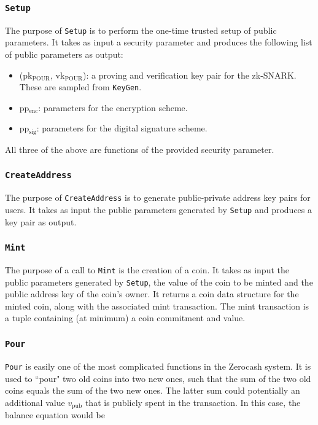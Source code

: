 \documentclass{article}
\begin{document}
\subsubsection{\texttt{Setup}}
The purpose of \texttt{Setup} is to perform the one-time trusted setup of public parameters. It takes as input a security parameter and produces the following list of public parameters as output:
\begin{itemize}
\item (pk$_{\text{POUR}}$, vk$_{\text{POUR}}$): a proving and verification key pair for the zk-SNARK. These are sampled from \texttt{KeyGen}.
\item pp$_{\text{enc}}$: parameters for the encryption scheme.
\item pp$_{\text{sig}}$: parameters for the digital signature scheme.
\end{itemize}
All three of the above are functions of the provided security parameter.

\subsubsection{\texttt{CreateAddress}}
The purpose of \texttt{CreateAddress} is to generate public-private address key pairs for users. It takes as input the public parameters generated by \texttt{Setup} and produces a key pair as output.

\subsubsection{\texttt{Mint}}
The purpose of a call to \texttt{Mint} is the creation of a coin. It takes as input the public parameters generated by \texttt{Setup}, the value of the coin to be minted and the public address key of the coin's owner. It returns a coin data structure for the minted coin, along with the associated mint transaction. The mint transaction is a tuple containing (at minimum) a coin commitment and value.

\subsubsection{\texttt{Pour}}
\texttt{Pour} is easily one of the most complicated functions in the Zerocash system. It is used to ``pour" two old coins into two new ones, such that the sum of the two old coins equals the sum of the two new ones. The latter sum could potentially an additional value $v_{\text{pub}}$ that is publicly spent in the transaction. In this case, the balance equation would be 
\end{document}
